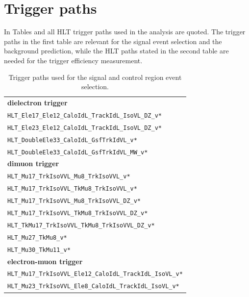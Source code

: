 \chapter{Trigger paths}

In Tables  and  all HLT trigger paths used in the analysis are quoted. The trigger paths in the first table are relevant for the signal event selection and the background prediction, while the HLT paths stated in the second table are needed for the trigger efficiency measurement.

\begin{table}[htb]
 \centering
 \caption{Trigger paths used for the signal and control region event selection.}
 \normalsize
 \label{tab:app_trigger1}
 \begin{tabular}[width=\textwidth]{l}
  \hline
  \normalsize{\textbf{dielectron trigger}}    \\
  \verb|HLT_Ele17_Ele12_CaloIdL_TrackIdL_IsoVL_DZ_v*|                     \\
  \verb|HLT_Ele23_Ele12_CaloIdL_TrackIdL_IsoVL_DZ_v*|                     \\
  \verb|HLT_DoubleEle33_CaloIdL_GsfTrkIdVL_v*|                     \\
  \verb|HLT_DoubleEle33_CaloIdL_GsfTrkIdVL_MW_v*|                     \\
  \normalsize{\textbf{dimuon trigger}}        \\
  \verb|HLT_Mu17_TrkIsoVVL_Mu8_TrkIsoVVL_v*|                     \\
  \verb|HLT_Mu17_TrkIsoVVL_TkMu8_TrkIsoVVL_v*|                     \\
  \verb|HLT_Mu17_TrkIsoVVL_Mu8_TrkIsoVVL_DZ_v*|                     \\
  \verb|HLT_Mu17_TrkIsoVVL_TkMu8_TrkIsoVVL_DZ_v*|                     \\
  \verb|HLT_TkMu17_TrkIsoVVL_TkMu8_TrkIsoVVL_DZ_v*|                     \\
  \verb|HLT_Mu27_TkMu8_v*|                     \\
  \verb|HLT_Mu30_TkMu11_v*|                     \\
  \normalsize{\textbf{electron-muon trigger}} \\
  \verb|HLT_Mu17_TrkIsoVVL_Ele12_CaloIdL_TrackIdL_IsoVL_v*|                     \\
  \verb|HLT_Mu23_TrkIsoVVL_Ele8_CaloIdL_TrackIdL_IsoVL_v*|                     \\

\end{tabular}
\end{table}
